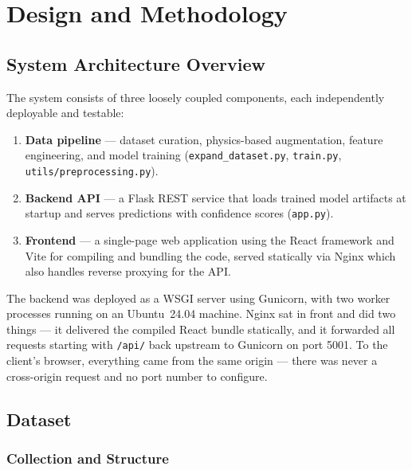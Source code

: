 \chapter{Design and Methodology}\label{ch:B}

\section{System Architecture Overview}

The system consists of three loosely coupled components, each independently
deployable and testable:

\begin{enumerate}
  \item \textbf{Data pipeline} --- dataset curation, physics-based augmentation,
        feature engineering, and model training
        (\texttt{expand\_dataset.py}, \texttt{train.py},
        \texttt{utils/preprocessing.py}).

  \item \textbf{Backend API} --- a Flask REST service that loads trained model
        artifacts at startup and serves predictions with confidence scores
        (\texttt{app.py}).

  \item \textbf{Frontend} --- a single-page web application using the React
        framework and Vite for compiling and bundling the code, served
        statically via Nginx which also handles reverse proxying for the API.
\end{enumerate}

The backend was deployed as a WSGI server using Gunicorn, with two worker
processes running on an Ubuntu~24.04 machine.
Nginx sat in front and did two things --- it delivered the compiled React
bundle statically, and it forwarded all requests starting with \texttt{/api/}
back upstream to Gunicorn on port 5001.
To the client's browser, everything came from the same origin --- there was
never a cross-origin request and no port number to configure.

\section{Dataset}

\subsection{Collection and Structure}

